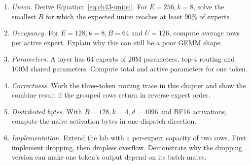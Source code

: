 \ExercisesSection
\begin{enumerate}
\item \emph{Union.} Derive Equation~\eqref{eq:ch43-union}. For $E=256,k=8$, solve the
smallest $B$ for which the expected union reaches at least 90\% of experts.
\item \emph{Occupancy.} For $E=128,k=8,B=64$ and $U=126$, compute average rows per
active expert. Explain why this can still be a poor GEMM shape.
\item \emph{Parameters.} A layer has 64 experts of 20M parameters, top-4 routing and
100M shared parameters. Compute total and active parameters for one token.
\item \emph{Correctness.} Work the three-token routing trace in this chapter and show
the combine result if the grouped rows return in reverse expert order.
\item \emph{Distributed bytes.} With $B=128,k=4,d=4096$ and BF16 activations, compute
the naive activation bytes in one dispatch direction.
\item \emph{Implementation.} Extend the lab with a per-expert capacity of two rows.
First implement dropping, then dropless overflow. Demonstrate why the dropping version
can make one token's output depend on its batch-mates.
\end{enumerate}


